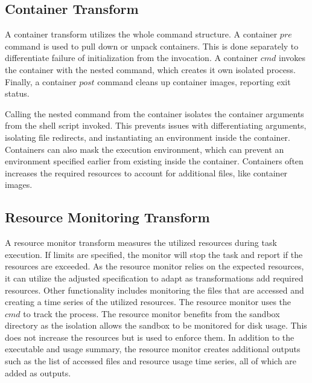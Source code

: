 \documentclass[conference]{IEEEtran}
\begin{document}
\subsection{Container Transform}

A container transform utilizes the whole
command structure.
A container $pre$ command is used to pull down
or unpack containers.
This is done separately to 
differentiate failure of initialization
from the invocation.
A container $cmd$ invokes the container with the 
nested command, which creates it own isolated process.
Finally, a container $post$ command cleans
up container images, reporting exit status.

Calling the nested command from the container
isolates the container arguments from the shell
script invoked. This prevents issues with 
differentiating arguments, isolating file
redirects, and instantiating an environment
inside the container.
Containers can also mask the execution environment,
which can prevent an environment specified earlier from
existing inside the container. 
Containers often increases the required resources
to account for additional files,
like container images.

\subsection{Resource Monitoring Transform}

A resource monitor transform measures the utilized resources 
during task execution. 
If limits are specified, 
the monitor will stop the task and 
report if the resources are exceeded. 
As the resource monitor relies on the 
expected resources, it can utilize the 
adjusted specification to adapt
as transformations add required resources.
Other functionality includes 
monitoring the files that are accessed and 
creating a time series of the
utilized resources.
The resource monitor uses the $cmd$ 
to track the process. 
The resource monitor benefits from the 
sandbox directory as the isolation allows 
the sandbox to be monitored for disk usage.
This does not increase the resources
but is used to enforce them.
In addition to the executable and usage summary, 
the resource monitor creates additional outputs
such as the list of accessed files and 
resource usage time series, all of which
are added as outputs.
\end{document}
